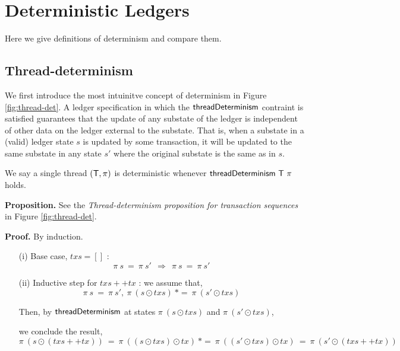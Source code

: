\section{Deterministic Ledgers}
\label{sec:determinism}

Here we give definitions of determinism and compare them.

\subsection{Thread-determinism}
\label{sec:thread-det}

We first introduce the most intuinitve concept of determinism in Figure \ref{fig:thread-det}.
A ledger specification in which the $\mathsf{threadDeterminism}$ contraint is satisfied
guarantees that the update of any substate of the ledger is independent of
other data on the ledger external to the substate. That is, when a substate in a (valid)
ledger state $s$ is updated by some transaction, it will be updated
to the same substate in any state $s'$ where the original substate is the same as in $s$.

We say a single thread $(\mathsf{T}, \pi)$ is deterministic whenever $\mathsf{threadDeterminism}~\mathsf{T}~\pi$
holds.


\textbf{Proposition. } See the \emph{Thread-determinism proposition for transaction sequences}
in Figure \ref{fig:thread-det}.

\textbf{Proof.} By induction.

\begin{itemize}
  \item[(i)] Base case, $txs = []$ :
  \[\pi~s~=~\pi~s'~~\Rightarrow~~\pi~s~=~\pi~s' \]
  \item[(ii)] Inductive step for $txs ++ tx$ : we assume that,
  \[ \pi~s~=~\pi~s',~\pi~(s\odot txs)~*=~\pi~(s'\odot txs) \]

  Then, by $\mathsf{threadDeterminism}$ at states $\pi~(s\odot txs)$ and $\pi~(s'\odot txs)$,

  we conclude the result,
  \[ \pi~(s\odot (txs ++ tx)) ~=~\pi~((s\odot txs) \odot tx) ~*=~\pi~((s'\odot txs) \odot tx)~=~\pi~(s'\odot (txs ++ tx)) \]
\end{itemize}

